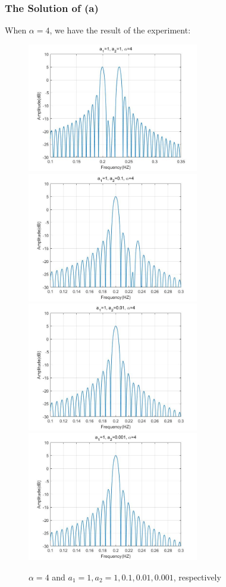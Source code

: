 \documentclass[UTF-8, a4paper, 12pt]{ctexart}
\begin{document}
\subsubsection{The Solution of (a)}
When $\alpha=4$, we have the result of the experiment:
\begin{figure}[htbp]
    \centering
    \includegraphics[width=7.5cm ]{2/ea1.jpg}
    \includegraphics[width=7.5cm ]{2/ea2.jpg}
    \includegraphics[width=7.5cm ]{2/ea3.jpg}
    \includegraphics[width=7.5cm ]{2/ea4.jpg}
    \caption{$\alpha=4$ and $a_1=1, a_2=1, 0.1,0.01,0.001$, respectively}
\end{figure}
\end{document}
